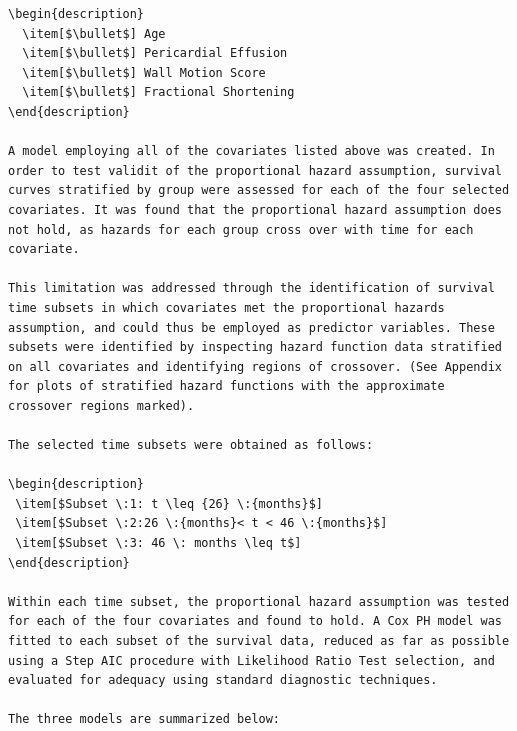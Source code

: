 \documentclass[
]{article}
\begin{document}
\begin{verbatim}
\begin{description}
  \item[$\bullet$] Age
  \item[$\bullet$] Pericardial Effusion
  \item[$\bullet$] Wall Motion Score
  \item[$\bullet$] Fractional Shortening
\end{description}

A model employing all of the covariates listed above was created. In order to test validit of the proportional hazard assumption, survival curves stratified by group were assessed for each of the four selected covariates. It was found that the proportional hazard assumption does not hold, as hazards for each group cross over with time for each covariate. 

This limitation was addressed through the identification of survival time subsets in which covariates met the proportional hazards assumption, and could thus be employed as predictor variables. These subsets were identified by inspecting hazard function data stratified on all covariates and identifying regions of crossover. (See Appendix for plots of stratified hazard functions with the approximate crossover regions marked).

The selected time subsets were obtained as follows:

\begin{description}
 \item[$Subset \:1: t \leq {26} \:{months}$]
 \item[$Subset \:2:26 \:{months}< t < 46 \:{months}$]
 \item[$Subset \:3: 46 \: months \leq t$]
\end{description}

Within each time subset, the proportional hazard assumption was tested for each of the four covariates and found to hold. A Cox PH model was fitted to each subset of the survival data, reduced as far as possible using a Step AIC procedure with Likelihood Ratio Test selection, and evaluated for adequacy using standard diagnostic techniques. 

The three models are summarized below: 



\end{verbatim}
\end{document}
